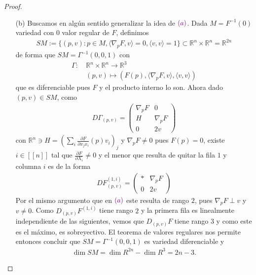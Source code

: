 \documentclass[11pt]{article}
\newcommand{\R}{\mathbb{R}}
\newcommand{\dpart}[2]{\frac{\partial#1}{\partial#2}}
\newcommand{\nat}[1]{[\![#1]\!]}
\newcommand{\ip}[2]{\langle #1 , #2 \rangle}
\newcommand{\paint}[2]{\color{#1}{#2}}
\begin{document}
\begin{proof}
\begin{itemize}
\item[(b)] Buscamos en alg\'un sentido generalizar la idea de $\paint{purple}{(a)}$. Dada $M = F^{-1}(0)$ variedad con $0$ valor regular de $F$, definimos
\begin{align*}
SM := \{(p,v) : p \in M, \ip{\nabla_pF}{v} = 0, \ip{v}{v} = 1\} \subset \R^n \times \R^n = \R^{2n}
\end{align*}
de forma que $SM = \Gamma^{-1}(0,0,1)$ con
\begin{align*}
\Gamma : \ &\R^n \times \R^n \to \R^3 \\
&(p,v) \longmapsto (F(p),\ip{\nabla_pF}{v},\ip{v}{v})
\end{align*}
que es diferenciable pues $F$ y el producto interno lo son. Ahora dado $(p,v) \in SM$, como
\begin{align*}
D\Gamma_{(p,v)} = \begin{pmatrix}
\nabla_pF & 0\\
H & \nabla_pF\\
0 & 2v
\end{pmatrix}
\end{align*}
con $\R^n \ni H = \left(\sum_i\dpart{F}{x_jx_i}(p)v_i\right)_j$ y $\nabla_pF \neq 0$ pues $F(p) = 0$, existe $i \in \nat{n}$ tal que $\dpart{F}{X_i} \neq 0$ y el menor que resulta de quitar la fila $1$ y columna $i$ es de la forma
\begin{align*}
DF_{(p,v)}^{(1,i)} = \begin{pmatrix}
* & \nabla_pF \\
0 & 2v
\end{pmatrix}
\end{align*}
Por el mismo argumento que en $\paint{purple}{(a)}$ este resulta de rango $2$, pues $\nabla_pF \perp v$ y $v \neq 0$. Como $D_{(p,v)}F^{(1,i)}$ tiene rango $2$ y la primera fila es linealmente independiente de las siguientes, vemos que $D_{(p,v)}F$ tiene rango $3$ y como este es el m\'aximo, es sobreyectivo. El teorema de valores regulares nos permite entonces concluir que $SM = \Gamma^{-1}(0,0,1)$ es variedad diferenciable y
\begin{align*}
\dim SM = \dim R^{2n} - \dim R^3 = 2n-3.
\end{align*}
\end{itemize}
\end{proof}
\end{document}
